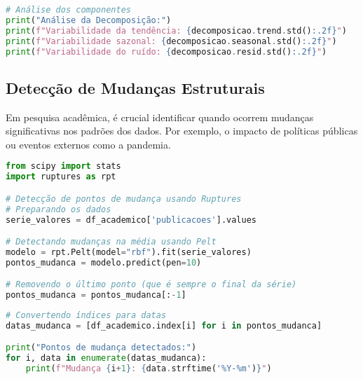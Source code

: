 \begin{pythonbox}
\begin{lstlisting}[language=Python]
# Análise dos componentes
print("Análise da Decomposição:")
print(f"Variabilidade da tendência: {decomposicao.trend.std():.2f}")
print(f"Variabilidade sazonal: {decomposicao.seasonal.std():.2f}")
print(f"Variabilidade do ruído: {decomposicao.resid.std():.2f}")
\end{lstlisting}
\end{pythonbox}

\subsection{Detecção de Mudanças Estruturais}

\begin{researchbox}
Em pesquisa acadêmica, é crucial identificar quando ocorrem mudanças significativas nos padrões dos dados. Por exemplo, o impacto de políticas públicas ou eventos externos como a pandemia.
\end{researchbox}

\begin{pythonbox}
\begin{lstlisting}[language=Python]
from scipy import stats
import ruptures as rpt

# Detecção de pontos de mudança usando Ruptures
# Preparando os dados
serie_valores = df_academico['publicacoes'].values

# Detectando mudanças na média usando Pelt
modelo = rpt.Pelt(model="rbf").fit(serie_valores)
pontos_mudanca = modelo.predict(pen=10)

# Removendo o último ponto (que é sempre o final da série)
pontos_mudanca = pontos_mudanca[:-1]
\end{lstlisting}
\end{pythonbox}

\begin{pythonbox}
\begin{lstlisting}[language=Python]
# Convertendo índices para datas
datas_mudanca = [df_academico.index[i] for i in pontos_mudanca]

print("Pontos de mudança detectados:")
for i, data in enumerate(datas_mudanca):
    print(f"Mudança {i+1}: {data.strftime('%Y-%m')}")
\end{lstlisting}
\end{pythonbox}

